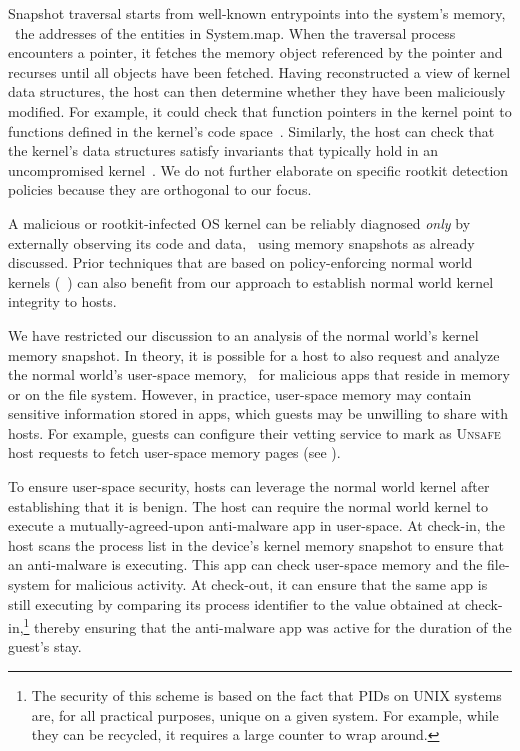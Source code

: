 Snapshot traversal starts from well-known entrypoints into the system's memory,
\eg~the addresses of the entities in \textsf{System.map}. When the traversal
process encounters a pointer, it fetches the memory object referenced by the
pointer and recurses until all objects have been fetched.  Having reconstructed
a view of kernel data structures, the host can then determine whether they have
been maliciously modified. For example, it could check that function pointers
in the kernel point to functions defined in the kernel's code
space~\cite{sbcfi:ccs07}. Similarly, the host can check that the kernel's data
structures satisfy invariants that typically hold in an uncompromised
kernel~\cite{gib:tdsc11}. We do not further elaborate on specific rootkit
detection policies because they are orthogonal to our focus.

A malicious or rootkit-infected OS kernel can be reliably diagnosed
\textit{only} by externally observing its code and data, \eg~using memory
snapshots as already discussed. Prior techniques that are based on
policy-enforcing normal world kernels
(\eg~\cite{asm:sec14,flaskdroid:sec13,conxsense:asiaccs14,worlddriven:ccs14,blindspot:2009,markit:upside14})
can also benefit from our approach to establish normal world kernel integrity
to hosts.

We have restricted our discussion to an analysis of the normal world's kernel
memory snapshot. In theory, it is possible for a host to also request and
analyze the normal world's user-space memory, \eg~for malicious apps that
reside in memory or on the file system. However, in practice, user-space
memory may contain sensitive information stored in apps, which guests may be
unwilling to share with hosts. For example, guests can configure their vetting
service to mark as \textsc{Unsafe} host requests to fetch user-space memory
pages (see ). 

To ensure user-space security, hosts can leverage the normal world kernel after
establishing that it is benign. The host can require the normal world kernel to
execute a mutually-agreed-upon anti-malware app in user-space. At check-in, the
host scans the process list in the device's kernel memory snapshot to ensure
that an anti-malware is executing. This app can check user-space memory and the
file-system for malicious activity. At check-out, it can ensure that the same
app is still executing by comparing its process identifier to the value
obtained at check-in,\footnote{The security of this scheme is based on the fact
that PIDs on UNIX systems are, for all practical purposes, unique on a given
system. For example, while they can be recycled, it requires a large counter to
wrap around.} thereby ensuring that the anti-malware app was active for the
duration of the guest's stay.

